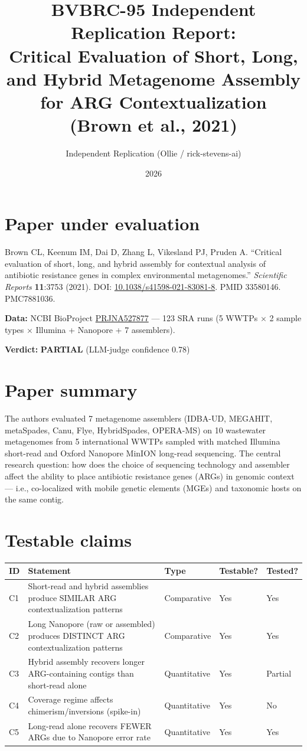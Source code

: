 \documentclass[11pt]{article}
\title{BVBRC-95 Independent Replication Report:\\
Critical Evaluation of Short, Long, and Hybrid Metagenome Assembly for ARG Contextualization\\
(Brown et al., 2021)}
\author{Independent Replication (Ollie / rick-stevens-ai)}
\date{2026}
\begin{document}
\maketitle

\section*{Paper under evaluation}
Brown CL, Keenum IM, Dai D, Zhang L, Vikesland PJ, Pruden A. ``Critical evaluation of short, long, and hybrid assembly for contextual analysis of antibiotic resistance genes in complex environmental metagenomes.'' \textit{Scientific Reports} \textbf{11}:3753 (2021). DOI: \href{https://doi.org/10.1038/s41598-021-83081-8}{10.1038/s41598-021-83081-8}. PMID 33580146. PMC7881036.

\textbf{Data:} NCBI BioProject \href{https://www.ncbi.nlm.nih.gov/bioproject/PRJNA527877}{PRJNA527877} --- 123 SRA runs (5 WWTPs $\times$ 2 sample types $\times$ Illumina + Nanopore + 7 assemblers).

\textbf{Verdict:} \textbf{PARTIAL} (LLM-judge confidence 0.78)

\section{Paper summary}
The authors evaluated 7 metagenome assemblers (IDBA-UD, MEGAHIT, metaSpades, Canu, Flye, HybridSpades, OPERA-MS) on 10 wastewater metagenomes from 5 international WWTPs sampled with matched Illumina short-read and Oxford Nanopore MinION long-read sequencing. The central research question: how does the choice of sequencing technology and assembler affect the ability to place antibiotic resistance genes (ARGs) in genomic context --- i.e., co-localized with mobile genetic elements (MGEs) and taxonomic hosts on the same contig.

\section{Testable claims}
\begin{tabularx}{\linewidth}{@{}lXlll@{}}
\toprule
ID & Statement & Type & Testable? & Tested? \\
\midrule
C1 & Short-read and hybrid assemblies produce SIMILAR ARG contextualization patterns & Comparative & Yes & Yes \\
C2 & Long Nanopore (raw or assembled) produces DISTINCT ARG contextualization patterns & Comparative & Yes & Yes \\
C3 & Hybrid assembly recovers longer ARG-containing contigs than short-read alone & Quantitative & Yes & Partial \\
C4 & Coverage regime affects chimerism/inversions (spike-in) & Quantitative & Yes & No \\
C5 & Long-read alone recovers FEWER ARGs due to Nanopore error rate & Quantitative & Yes & Yes \\
\bottomrule
\end{tabularx}
\end{document}
